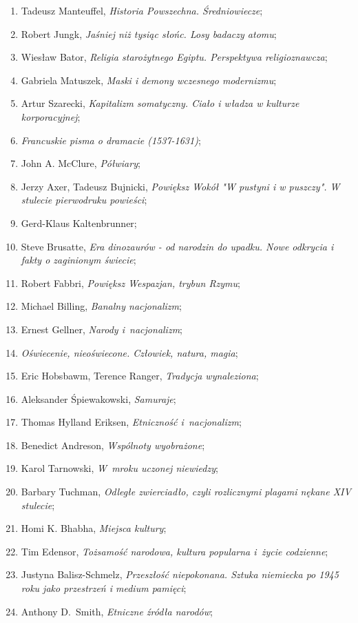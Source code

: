 \documentclass[a4paper,11pt]{article}
\begin{document}
\begin{enumerate}
{    narzędziach badań literatury};
\item Tadeusz Manteuffel, \emph{Historia Powszechna. Średniowiecze};
\item Robert Jungk, \emph{Jaśniej niż tysiąc słońc. Losy badaczy
    atomu};
\item Wiesław Bator, \emph{Religia starożytnego Egiptu. Perspektywa
    religioznawcza};
\item Gabriela Matuszek, \emph{Maski i demony wczesnego modernizmu};
\item Artur Szarecki, \emph{Kapitalizm somatyczny. Ciało i władza w
    kulturze korporacyjnej};
\item \emph{Francuskie pisma o dramacie (1537-1631)};
\item John A. McClure, \emph{Półwiary};
\item Jerzy Axer, Tadeusz Bujnicki, \emph{Powiększ Wokół "W pustyni i
    w puszczy". W stulecie pierwodruku powieści};
\item Gerd-Klaus Kaltenbrunner;
\item Steve Brusatte, \emph{Era dinozaurów - od narodzin do upadku.
    Nowe odkrycia i fakty o zaginionym świecie};
\item Robert Fabbri, \emph{Powiększ Wespazjan, trybun Rzymu};
\item Michael Billing, \emph{Banalny nacjonalizm};
\item Ernest Gellner, \emph{Narody i~nacjonalizm};
\item \emph{Oświecenie, nieoświecone. Człowiek, natura, magia};
\item Eric Hobsbawm, Terence Ranger, \emph{Tradycja wynaleziona};
\item Aleksander Śpiewakowski, \emph{Samuraje};
\item Thomas Hylland Eriksen, \emph{Etniczność i~nacjonalizm};
\item Benedict Andreson, \emph{Wspólnoty wyobrażone};
\item Karol Tarnowski, \emph{W~mroku uczonej niewiedzy};
\item Barbary Tuchman, \emph{Odległe zwierciadło, czyli rozlicznymi
    plagami nękane XIV stulecie};
\item Homi K. Bhabha, \emph{Miejsca kultury};
\item Tim Edensor, \emph{Tożsamość narodowa, kultura popularna i~życie
    codzienne};
\item Justyna Balisz-Schmelz, \emph{Przeszłość niepokonana. Sztuka
    niemiecka po 1945 roku jako przestrzeń i medium pamięci};
\item Anthony D.~Smith, \emph{Etniczne źródła narodów};

\end{enumerate}
\end{document}
